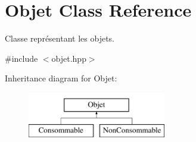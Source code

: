 \hypertarget{class_objet}{\section{Objet Class Reference}
\label{class_objet}
}


Classe représentant les objets.  




{\ttfamily \#include $<$objet.\-hpp$>$}

Inheritance diagram for Objet\-:\begin{figure}[H]
\begin{center}
\leavevmode
\includegraphics[height=2.000000cm]{class_objet}
\end{center}
\end{figure}
